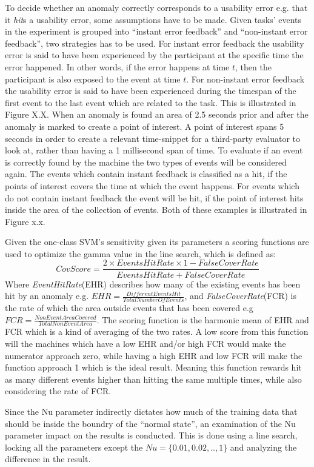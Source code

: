 To decide whether an anomaly correctly corresponds to a usability error e.g. that it \textit{hit}s a usability error, some assumptions have to be made. 
Given tasks' events in the experiment is grouped into ``instant error feedback'' and ``non-instant error feedback'', two strategies has to be used. 
For instant error feedback the usability error is said to have been experienced by the participant at the specific time the error happened. In other words, if the error happens at time $t$, then the participant is also exposed to the event at time $t$.
For non-instant error feedback the usability error is said to have been experienced during the timespan of the first event to the last event which are related to the task. This is illustrated in Figure X.X. 
When an anomaly is found an area of 2.5 seconds prior and after the anomaly is marked to create a point of interest. 
A point of interest spans 5 seconds in order to create a relevant time-snippet for a third-party evaluator to look at, rather than having a 1 millisecond span of time.
To evaluate if an event is correctly found by the machine the two types of events will be considered again.
The events which contain instant feedback is classified as a hit, if the points of interest covers the time at which the event happens.
For events which do not contain instant feedback the event will be hit, if the point of interest hits inside the area of the collection of events. Both of these examples is illustrated in Figure x.x. 

Given the one-class SVM's sensitivity given its parameters a scoring functions are used to optimize the gamma value in the line search, which is defined as: 
\[CovScore = \frac{2 \times EventsHitRate \times 1-FalseCoverRate}{EventsHitRate + FalseCoverRate}\]
Where \textit{EventHitRate}(EHR) describes how many of the existing events has been hit by an anomaly e.g. $EHR = \frac{DifferentEventsHit}{TotalNumberOfEvents}$, and \textit{FalseCoverRate}(FCR) is the rate of which the area outside events that has been covered e.g $FCR = \frac{NonEventAreaCovered}{TotalNonEventArea}$. 
The scoring function is the harmonic mean of EHR and FCR which is a kind of averaging of the two rates.
A low score from this function will the machines which have a low EHR and/or high FCR would make the numerator approach zero, while having a high EHR and low FCR will make the function approach 1 which is the ideal result.
Meaning this function rewards hit as many different events higher than hitting the same multiple times, while also considering the rate of FCR.

Since the Nu parameter indirectly dictates how much of the training data that should be inside the boundry of the ``normal state'', an examination of the Nu parameter impact on the results is conducted.
This is done using a line search, locking all the parameters except the $Nu = \{0.01, 0.02,.., 1\}$ and analyzing the difference in the result. 
